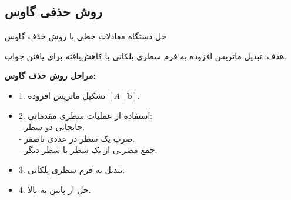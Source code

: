  \subsection{روش حذفی گاوس}
  حل دستگاه معادلات خطی با روش حذف گاوس 
 
 هدف: تبدیل ماتریس افزوده به فرم سطری پلکانی  یا کاهش‌یافته  برای یافتن جواب.
 

 
\textbf{  مراحل روش حذف گاوس:}\\
\begin{itemize}
\item 
  	 1. تشکیل ماتریس افزوده \([A \mid \mathbf{b}]\).
  	
\item 
  	
  	2. استفاده از عملیات سطری مقدماتی:\\
  	- جابجایی دو سطر.\\
  	- ضرب یک سطر در عددی ناصفر.\\
  	- جمع مضربی از یک سطر با سطر دیگر.
\item 
  	 3. تبدیل به فرم سطری پلکانی.
\item 
  	  4. حل از پایین به بالا.
 
\end{itemize}

